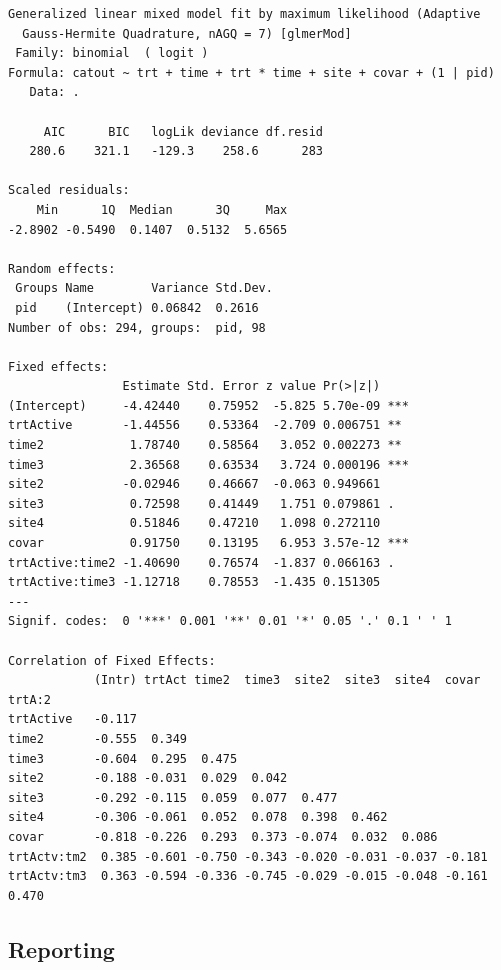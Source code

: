 \documentclass[
]{book}
\begin{document}
\begin{verbatim}
Generalized linear mixed model fit by maximum likelihood (Adaptive
  Gauss-Hermite Quadrature, nAGQ = 7) [glmerMod]
 Family: binomial  ( logit )
Formula: catout ~ trt + time + trt * time + site + covar + (1 | pid)
   Data: .

     AIC      BIC   logLik deviance df.resid 
   280.6    321.1   -129.3    258.6      283 

Scaled residuals: 
    Min      1Q  Median      3Q     Max 
-2.8902 -0.5490  0.1407  0.5132  5.6565 

Random effects:
 Groups Name        Variance Std.Dev.
 pid    (Intercept) 0.06842  0.2616  
Number of obs: 294, groups:  pid, 98

Fixed effects:
                Estimate Std. Error z value Pr(>|z|)    
(Intercept)     -4.42440    0.75952  -5.825 5.70e-09 ***
trtActive       -1.44556    0.53364  -2.709 0.006751 ** 
time2            1.78740    0.58564   3.052 0.002273 ** 
time3            2.36568    0.63534   3.724 0.000196 ***
site2           -0.02946    0.46667  -0.063 0.949661    
site3            0.72598    0.41449   1.751 0.079861 .  
site4            0.51846    0.47210   1.098 0.272110    
covar            0.91750    0.13195   6.953 3.57e-12 ***
trtActive:time2 -1.40690    0.76574  -1.837 0.066163 .  
trtActive:time3 -1.12718    0.78553  -1.435 0.151305    
---
Signif. codes:  0 '***' 0.001 '**' 0.01 '*' 0.05 '.' 0.1 ' ' 1

Correlation of Fixed Effects:
            (Intr) trtAct time2  time3  site2  site3  site4  covar  trtA:2
trtActive   -0.117                                                        
time2       -0.555  0.349                                                 
time3       -0.604  0.295  0.475                                          
site2       -0.188 -0.031  0.029  0.042                                   
site3       -0.292 -0.115  0.059  0.077  0.477                            
site4       -0.306 -0.061  0.052  0.078  0.398  0.462                     
covar       -0.818 -0.226  0.293  0.373 -0.074  0.032  0.086              
trtActv:tm2  0.385 -0.601 -0.750 -0.343 -0.020 -0.031 -0.037 -0.181       
trtActv:tm3  0.363 -0.594 -0.336 -0.745 -0.029 -0.015 -0.048 -0.161  0.470
\end{verbatim}

\subsection{Reporting}\label{reporting-2}
\end{document}
